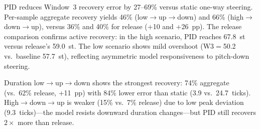 \documentclass{article}
\theoremstyle{plain}
\begin{document}
PID reduces Window~3 recovery error by 27--69\% versus static one-way steering. Per-sample aggregate recovery yields 46\% (low$\to$up$\to$down) and 66\% (high$\to$down$\to$up), versus 36\% and 40\% for release (+10 and +26~pp). The release comparison confirms active recovery: in the high scenario, PID reaches 67.8~st versus release's 59.0~st. The low scenario shows mild overshoot (W3$=$50.2 vs.\ baseline 57.7~st), reflecting asymmetric model responsiveness to pitch-down steering.

\begin{table}[h]
  \caption{Round-trip duration steering: per-window mean duration (ticks). Release stops steering in Phase~3 ($\lambda{=}0$).}
  \label{tab:roundtrip_duration}
  \begin{center}
  \end{center}
\end{table}

Duration low$\to$up$\to$down shows the strongest recovery: 74\% aggregate (vs.\ 62\% release, +11~pp) with 84\% lower error than static (3.9 vs.\ 24.7~ticks). High$\to$down$\to$up is weaker (15\% vs.\ 7\% release) due to low peak deviation (9.3~ticks)---the model resists downward duration changes---but PID still recovers $2{\times}$ more than release.
\end{document}
